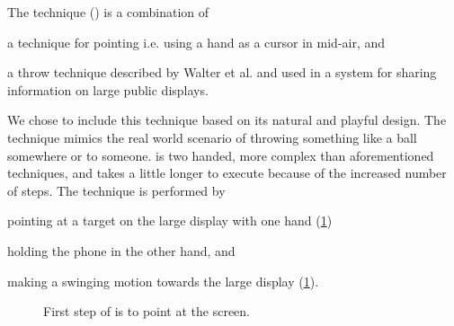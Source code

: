 The \throw technique () is a combination of  
\begin{enumerate*}[label=\itshape\alph*\upshape)]
	\item{a technique for pointing \cite{Scheible:2008} i.e. using a hand as a cursor in mid-air, and}
	\item{a throw technique described by Walter et al. \cite{Walter:2014} and used in a system for sharing information on large public displays.}
\end{enumerate*}
We chose to include this technique based on its natural and playful design.
The technique mimics the real world scenario of throwing something like a ball somewhere or to someone.
\throw is two handed, more complex than aforementioned techniques, and takes a little longer to execute because of the increased number of steps.
The \throw technique is performed by 
\begin{enumerate*}[label=\itshape\roman*\upshape)]
	\item{pointing at a target on the large display with one hand (\cref{fig:throwTechnique})} 
	\item{holding the phone in the other hand, and}
	\item{making a swinging motion towards the large display (\cref{fig:throwTechnique}).}
\end{enumerate*}

\begin{figure}[H]
\caption{
	\protect{} First step of \throw is to point at the screen.
}
\label{fig:throwTechnique}
\end{figure}

